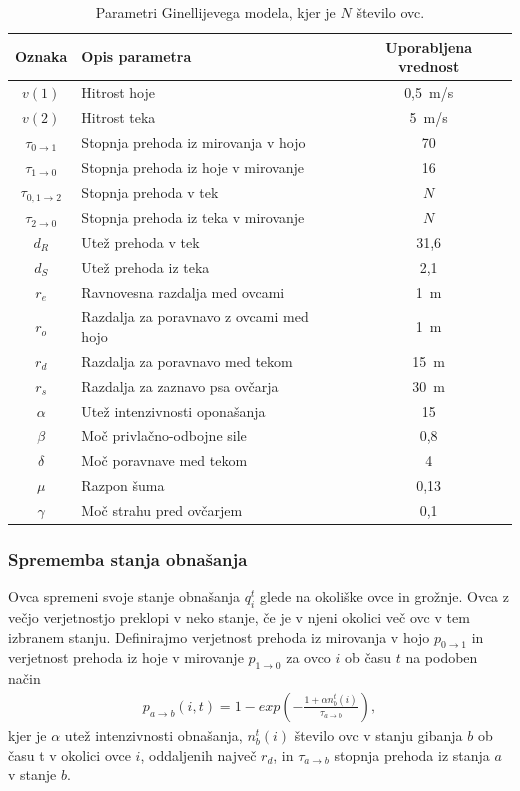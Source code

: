 \begin{table}[ht]
	\begin{center}
		\begin{tabular}{ c|l|c }
			\hline
			\textbf{Oznaka} & \textbf{Opis parametra} & \textbf{Uporabljena vrednost} \\ \hline  
			$v(1)$ & Hitrost hoje & 0,5~m/s \\ 
			$v(2)$ & Hitrost teka & 5~m/s \\ 
			$\tau_{0\rightarrow1}$ & Stopnja prehoda iz mirovanja v hojo & 70 \\ 
			$\tau_{1\rightarrow0}$ & Stopnja prehoda iz hoje v mirovanje & 16 \\ 
			$\tau_{0,1\rightarrow2}$ & Stopnja prehoda v tek & $N$ \\ 
			$\tau_{2\rightarrow0}$ & Stopnja prehoda iz teka v mirovanje & $N$ \\ 
			$d_R$ & Utež prehoda v tek & 31,6 \\ 
			$d_S$ & Utež prehoda iz teka & 2,1 \\ 
			$r_e$ & Ravnovesna razdalja med ovcami & 1~m \\ 
			$r_o$ & Razdalja za poravnavo z ovcami med hojo & 1~m \\ 
			$r_d$ & Razdalja za poravnavo med tekom & 15~m \\ 
			$r_s$ & Razdalja za zaznavo psa ovčarja & 30~m \\
			$\alpha$ & Utež intenzivnosti oponašanja & 15 \\ 
			$\beta$ & Moč privlačno-odbojne sile & 0,8 \\ 
			$\delta$ & Moč poravnave med tekom & 4 \\ 
			$\mu$ & Razpon šuma & 0,13 \\ 
			$\gamma$ & Moč strahu pred ovčarjem & 0,1 \\ 
			\hline
		\end{tabular}
	\end{center}
	\caption[Parametri Ginellijevega modela gibanja ovc]{Parametri Ginellijevega modela, kjer je $N$ število ovc.}
	\label{table:ginelli}
\end{table}

\subsubsection{Sprememba stanja obnašanja}

Ovca spremeni svoje stanje obnašanja $q_i^t$ glede na okoliške ovce in grožnje. Ovca z večjo verjetnostjo preklopi v neko stanje, če je v njeni okolici več ovc v tem izbranem stanju. Definirajmo verjetnost prehoda iz mirovanja v hojo $p_{0\rightarrow1}$ in verjetnost prehoda iz hoje v mirovanje $p_{1\rightarrow0}$ za ovco $i$ ob času $t$ na podoben način
\begin{align}
p_{a\rightarrow b}(i, t)=1 - exp(-\frac{1+\alpha n_b^t(i)}{\tau_{a\rightarrow b}}), \label{eq:stanje-hoja}
\end{align}
kjer je $\alpha$ utež intenzivnosti obnašanja, $n_b^t(i)$ število ovc v stanju gibanja $b$ ob času t v okolici ovce $i$, oddaljenih največ $r_d$, in $\tau_{a\rightarrow b}$ stopnja prehoda iz stanja $a$ v stanje $b$.

